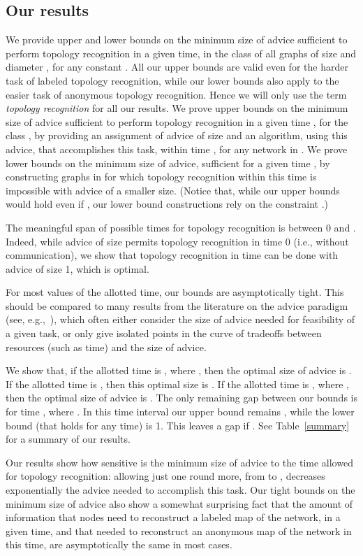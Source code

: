 \documentclass{article}
\begin{document}
\subsection{Our results}
We provide upper and lower bounds on the minimum size of advice sufficient to perform topology recognition in a given time,
in the class  of all graphs of size  and diameter , for any constant .
All our upper bounds are valid even for the harder task of labeled topology recognition, while our lower bounds also apply to the easier task of anonymous topology recognition. Hence we will only use the term {\em topology recognition} for all our results.
We prove upper bounds  on the minimum size of advice sufficient to perform topology recognition in a given time , for the class , by providing an assignment of advice of size  and an algorithm, using this advice, that accomplishes this task, within time , for any network in .
We prove lower bounds on the minimum size of advice, sufficient for a given time , by constructing graphs in  for which topology recognition within this time is impossible with advice of a smaller size. (Notice that, while our upper bounds would hold even if , our lower bound constructions rely on the constraint .)

The meaningful span of possible times for topology recognition is  between 0 and 
. Indeed, while  advice of size  permits topology recognition in time 0 (i.e., without communication), we show that topology recognition in time   can be done with advice of size 1, which is optimal. 

For most values of the allotted time, our bounds are asymptotically tight.
This should be compared to many results from the literature on the advice paradigm (see, e.g.,~\cite{CFIKP,FGIP,FIP1,FKL,SN}), which often either consider the size of advice  needed for feasibility of a given task, or only give isolated points in the curve 
of tradeoffs between resources (such as time) and the size of advice.

We show that, if the allotted time is , where ,  then the optimal size of advice is  .
If the allotted time is , then this optimal size is .
If the allotted time is , where ,  then the optimal size of advice is .
The only remaining gap between our bounds is for time ,  where .
In this time interval our upper bound remains  , while the lower bound (that holds for any time) is 1. This leaves a gap  if .
See Table~\ref{summary} for a summary of our results.


Our results show how sensitive is the minimum
size of advice to the time allowed for topology recognition: allowing just one round more, from 
to , decreases exponentially the advice needed to accomplish this task.
Our tight bounds on the minimum size of advice also show a somewhat surprising fact that the amount of information that nodes need to reconstruct a labeled map of the network, in a given time, and that needed to reconstruct an anonymous map of the network in this time, are asymptotically the same in most cases.
\end{document}
